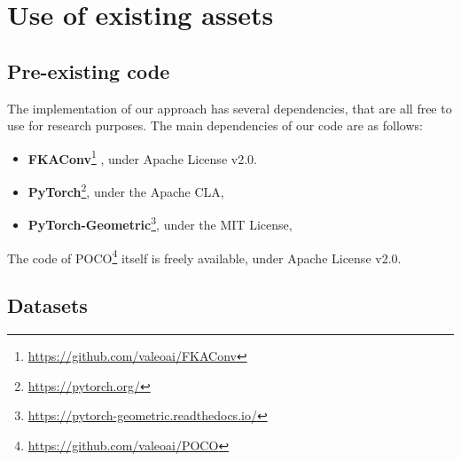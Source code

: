 \documentclass[10pt,twocolumn,letterpaper]{article}
\newcommand\OURS{{POCO}}
\begin{document}
\FloatBarrier

\section{Use of existing assets}

\subsection{Pre-existing code}

The implementation of our approach has several dependencies, that are all free to use for research purposes. The main dependencies of our code are as follows:
\begin{itemize}[itemsep=4pt,topsep=4pt, parsep=0pt]

    \item \textbf{FKAConv}\footnote{\label{foot:fkaconv}\url{https://github.com/valeoai/FKAConv}} \cite{Boulch2020ACCV}, under Apache License v2.0.

    \item \textbf{PyTorch}\footnote{\label{foot:pytorch}\url{https://pytorch.org/}}, under the Apache CLA,

    \item \textbf{PyTorch-Geometric}\footnote{\label{foot:pytorchgeom}\url{https://pytorch-geometric.readthedocs.io/}}, under the MIT License,

\end{itemize}
The code of {\OURS}\footnote{\url{https://github.com/valeoai/POCO}} itself is freely available, under Apache License v2.0.

\subsection{Datasets}\label{sec:assetsdatasets}
\end{document}
